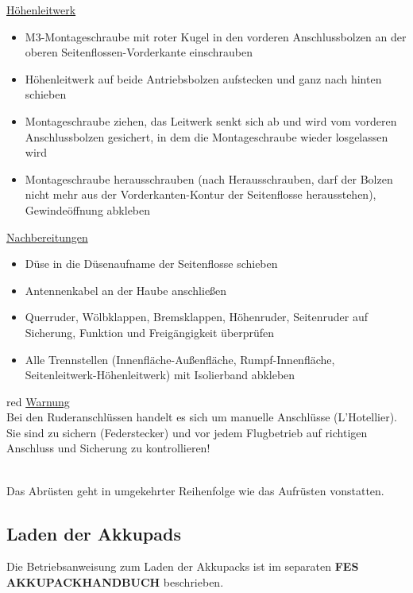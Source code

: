 \underline{Höhenleitwerk}
\begin{itemize}
\item M3-Montageschraube mit roter Kugel in den vorderen Anschlussbolzen an der oberen Seitenflossen-Vorderkante einschrauben
\item Höhenleitwerk auf beide Antriebsbolzen aufstecken und ganz nach hinten schieben
\item Montageschraube ziehen, das Leitwerk senkt sich ab und wird vom vorderen Anschlussbolzen gesichert, in dem die Montageschraube wieder losgelassen wird
\item Montageschraube herausschrauben (nach Herausschrauben, darf der Bolzen nicht mehr aus der Vorderkanten-Kontur der Seitenflosse herausstehen), Gewindeöffnung abkleben
\end{itemize}

\underline{Nachbereitungen}
\begin{itemize}
\item Düse in die Düsenaufname der Seitenflosse schieben
\item Antennenkabel an der Haube anschließen
\item Querruder, Wölbklappen, Bremsklappen, Höhenruder, Seitenruder auf Sicherung, Funktion und Freigängigkeit überprüfen
\item Alle Trennstellen (Innenfläche-Außenfläche, Rumpf-Innenfläche, Seitenleitwerk-Höhenleitwerk) mit Isolierband abkleben
\end{itemize}
\begin{color}{red}
\large{\underline{Warnung}}\\
Bei den Ruderanschlüssen handelt es sich um manuelle Anschlüsse (L'Hotellier). Sie sind zu sichern (Federstecker) und vor jedem Flugbetrieb auf richtigen Anschluss und Sicherung zu kontrollieren!
\end{color}\\

Das Abrüsten geht in umgekehrter Reihenfolge wie das Aufrüsten vonstatten.

\subsection{Laden der Akkupads}

Die Betriebsanweisung zum Laden der Akkupacks ist im separaten \textbf{FES
AKKUPACKHANDBUCH} beschrieben.\\

